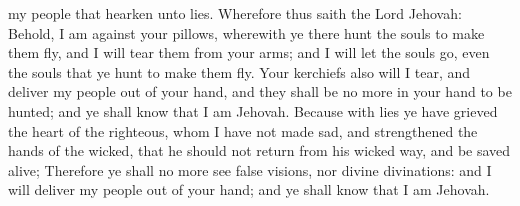 my people that hearken unto lies.  Wherefore thus saith the Lord Jehovah: Behold, I am against your pillows, wherewith ye there hunt the souls to make them fly, and I will tear them from your arms; and I will let the souls go, even the souls that ye hunt to make them fly. Your kerchiefs also will I tear, and deliver my people out of your hand, and they shall be no more in your hand to be hunted; and ye shall know that I am Jehovah. Because with lies ye have grieved the heart of the righteous, whom I have not made sad, and strengthened the hands of the wicked, that he should not return from his wicked way, and be saved alive; Therefore ye shall no more see false visions, nor divine divinations: and I will deliver my people out of your hand; and ye shall know that I am Jehovah. 

